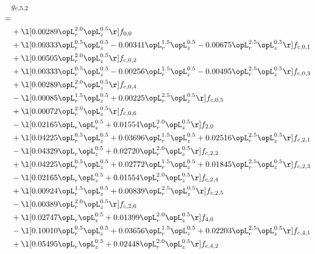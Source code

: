 \begin{alignat}{2} 
\label{eq:g_52_0} 
& g_{c,5,2} \nonumber \\ 
 = \\ 
& + \l[  0.00289 \opL_r^{2.0} \opL_z^{0.5}  \r] f_{0,0} \nonumber \\ 
& + \l[  0.00333 \opL_r^{0.5} \opL_z^{0.5}   -0.00341 \opL_r^{1.5} \opL_z^{0.5}   -0.00675 \opL_r^{2.5} \opL_z^{0.5}  \r] f_{c,0,1} \nonumber \\ 
& + \l[  0.00505 \opL_r^{2.0} \opL_z^{0.5}  \r] f_{c,0,2} \nonumber \\ 
& + \l[  0.00333 \opL_r^{0.5} \opL_z^{0.5}   -0.00256 \opL_r^{1.5} \opL_z^{0.5}   -0.00495 \opL_r^{2.5} \opL_z^{0.5}  \r] f_{c,0,3} \nonumber \\ 
& + \l[  0.00289 \opL_r^{2.0} \opL_z^{0.5}  \r] f_{c,0,4} \nonumber \\ 
& - \l[  0.00085 \opL_r^{1.5} \opL_z^{0.5} +  0.00225 \opL_r^{2.5} \opL_z^{0.5}  \r] f_{c,0,5} \nonumber \\ 
& + \l[  0.00072 \opL_r^{2.0} \opL_z^{0.5}  \r] f_{c,0,6} \nonumber \\ 
& - \l[  0.02165 \opL_r \opL_z^{0.5} +  0.01554 \opL_r^{2.0} \opL_z^{0.5}  \r] f_{2,0} \nonumber \\ 
& + \l[  0.04225 \opL_r^{0.5} \opL_z^{0.5} +  0.03696 \opL_r^{1.5} \opL_z^{0.5} +  0.02516 \opL_r^{2.5} \opL_z^{0.5}  \r] f_{c,2,1} \nonumber \\ 
& - \l[  0.04329 \opL_r \opL_z^{0.5} +  0.02720 \opL_r^{2.0} \opL_z^{0.5}  \r] f_{c,2,2} \nonumber \\ 
& + \l[  0.04225 \opL_r^{0.5} \opL_z^{0.5} +  0.02772 \opL_r^{1.5} \opL_z^{0.5} +  0.01845 \opL_r^{2.5} \opL_z^{0.5}  \r] f_{c,2,3} \nonumber \\ 
& - \l[  0.02165 \opL_r \opL_z^{0.5} +  0.01554 \opL_r^{2.0} \opL_z^{0.5}  \r] f_{c,2,4} \nonumber \\ 
& + \l[  0.00924 \opL_r^{1.5} \opL_z^{0.5} +  0.00839 \opL_r^{2.5} \opL_z^{0.5}  \r] f_{c,2,5} \nonumber \\ 
& - \l[  0.00389 \opL_r^{2.0} \opL_z^{0.5}  \r] f_{c,2,6} \nonumber \\ 
& + \l[  0.02747 \opL_r \opL_z^{0.5} +  0.01399 \opL_r^{2.0} \opL_z^{0.5}  \r] f_{4,0} \nonumber \\ 
& - \l[  0.10010 \opL_r^{0.5} \opL_z^{0.5} +  0.03656 \opL_r^{1.5} \opL_z^{0.5} +  0.02203 \opL_r^{2.5} \opL_z^{0.5}  \r] f_{c,4,1} \nonumber \\ 
& + \l[  0.05495 \opL_r \opL_z^{0.5} +  0.02448 \opL_r^{2.0} \opL_z^{0.5}  \r] f_{c,4,2} \nonumber \\ 

\end{alignat}
